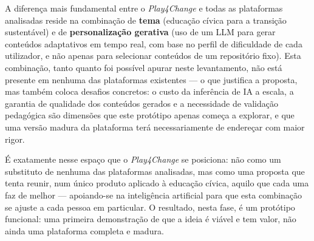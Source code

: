 A diferença mais fundamental entre o \emph{Play4Change} e todas as plataformas analisadas reside na combinação de \textbf{tema} (educação cívica para a transição sustentável) e de \textbf{personalização gerativa} (uso de um LLM para gerar conteúdos adaptativos em tempo real, com base no perfil de dificuldade de cada utilizador, e não apenas para selecionar conteúdos de um repositório fixo). Esta combinação, tanto quanto foi possível apurar neste levantamento, não está presente em nenhuma das plataformas existentes --- o que justifica a proposta, mas também coloca desafios concretos: o custo da inferência de IA a escala, a garantia de qualidade dos conteúdos gerados e a necessidade de validação pedagógica são dimensões que este protótipo apenas começa a explorar, e que uma versão madura da plataforma terá necessariamente de endereçar com maior rigor.

É exatamente nesse espaço que o \emph{Play4Change} se posiciona: não como um substituto de nenhuma das plataformas analisadas, mas como uma proposta que tenta reunir, num único produto aplicado à educação cívica, aquilo que cada uma faz de melhor --- apoiando-se na inteligência artificial para que esta combinação se ajuste a cada pessoa em particular. O resultado, nesta fase, é um protótipo funcional: uma primeira demonstração de que a ideia é viável e tem valor, não ainda uma plataforma completa e madura.
